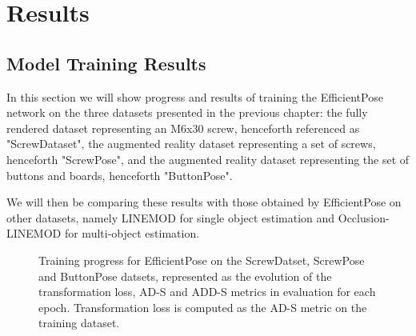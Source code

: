 \chapter{Results}

\section{Model Training Results}

In this section we will show progress and results of training the EfficientPose network on the three datasets presented in the previous chapter: the fully rendered dataset representing an M6x30 screw, henceforth referenced as "ScrewDataset", the augmented reality dataset representing a set of screws, henceforth "ScrewPose", and the augmented reality dataset representing the set of buttons and boards, henceforth "ButtonPose".

We will then be comparing these results with those obtained by EfficientPose on other datasets, namely LINEMOD for single object estimation and Occlusion-LINEMOD for multi-object estimation.

\begin{figure}[htp]



    \caption{Training progress for EfficientPose on the ScrewDatset, ScrewPose and ButtonPose datsets, represented as the evolution of the transformation loss, AD-S and ADD-S metrics in evaluation for each epoch. Transformation loss is computed as the AD-S metric on the training dataset.}
\end{figure}

